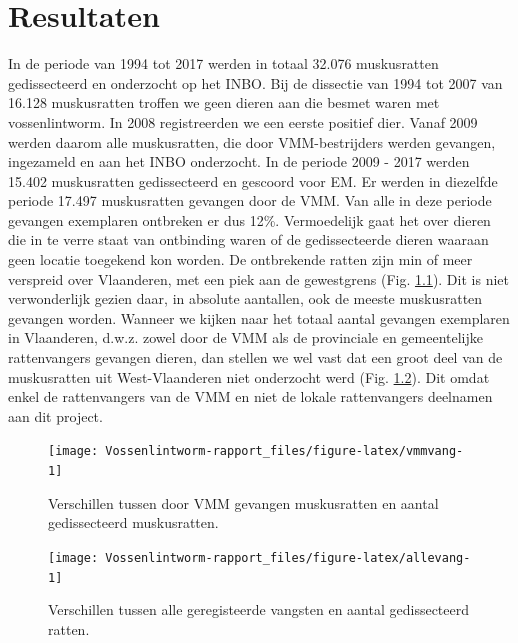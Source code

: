 \documentclass[twoside]{extreport}
\begin{document}
\chapter{Resultaten}\label{resultaten}

In de periode van 1994 tot 2017 werden in totaal 32.076 muskusratten
gedissecteerd en onderzocht op het INBO. Bij de dissectie van 1994 tot
2007 van 16.128 muskusratten troffen we geen dieren aan die besmet waren
met vossenlintworm. In 2008 registreerden we een eerste positief dier.
Vanaf 2009 werden daarom alle muskusratten, die door VMM-bestrijders
werden gevangen, ingezameld en aan het INBO onderzocht. In de periode
2009 - 2017 werden 15.402 muskusratten gedissecteerd en gescoord voor
EM. Er werden in diezelfde periode 17.497 muskusratten gevangen door de
VMM. Van alle in deze periode gevangen exemplaren ontbreken er dus 12\%.
Vermoedelijk gaat het over dieren die in te verre staat van ontbinding
waren of de gedissecteerde dieren waaraan geen locatie toegekend kon
worden. De ontbrekende ratten zijn min of meer verspreid over
Vlaanderen, met een piek aan de gewestgrens (Fig. \ref{fig:vmmvang}).
Dit is niet verwonderlijk gezien daar, in absolute aantallen, ook de
meeste muskusratten gevangen worden. Wanneer we kijken naar het totaal
aantal gevangen exemplaren in Vlaanderen, d.w.z. zowel door de VMM als
de provinciale en gemeentelijke rattenvangers gevangen dieren, dan
stellen we wel vast dat een groot deel van de muskusratten uit
West-Vlaanderen niet onderzocht werd (Fig. \ref{fig:allevang}). Dit
omdat enkel de rattenvangers van de VMM en niet de lokale rattenvangers
deelnamen aan dit project.

\begin{figure}

{\centering \texttt{[image: Vossenlintworm-rapport\_files/figure-latex/vmmvang-1]} 

}

\caption{Verschillen tussen door VMM gevangen muskusratten en aantal gedissecteerd muskusratten.}\label{fig:vmmvang}
\end{figure}

\begin{figure}

{\centering \texttt{[image: Vossenlintworm-rapport\_files/figure-latex/allevang-1]} 

}

\caption{Verschillen tussen alle geregisteerde vangsten en aantal gedissecteerd ratten.}\label{fig:allevang}
\end{figure}
\end{document}
